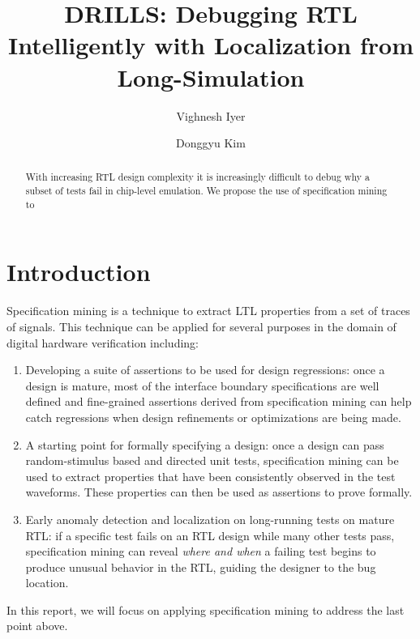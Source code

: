 \documentclass[acmlarge,11pt]{acmart}
\begin{document}
\title{DRILLS: Debugging RTL Intelligently with Localization from Long-Simulation}
\author{Vighnesh Iyer}
\author{Donggyu Kim}
\renewcommand{\shortauthors}{Iyer and Kim}

\begin{abstract}
  With increasing RTL design complexity it is increasingly difficult to debug why a subset of tests fail in chip-level emulation.
  We propose the use of specification mining to 
\end{abstract}
\maketitle
\thispagestyle{empty}
\section{Introduction}
Specification mining is a technique to extract LTL properties from a set of traces of signals.
This technique can be applied for several purposes in the domain of digital hardware verification including:
\begin{enumerate}
  \item Developing a suite of assertions to be used for design regressions: once a design is mature, most of the interface boundary specifications are well defined and fine-grained assertions derived from specification mining can help catch regressions when design refinements or optimizations are being made.
  \item A starting point for formally specifying a design: once a design can pass random-stimulus based and directed unit tests, specification mining can be used to extract properties that have been consistently observed in the test waveforms. These properties can then be used as assertions to prove formally.
  \item Early anomaly detection and localization on long-running tests on mature RTL: if a specific test fails on an RTL design while many other tests pass, specification mining can reveal \textit{where and when} a failing test begins to produce unusual behavior in the RTL, guiding the designer to the bug location.
\end{enumerate}
In this report, we will focus on applying specification mining to address the last point above.
\end{document}

